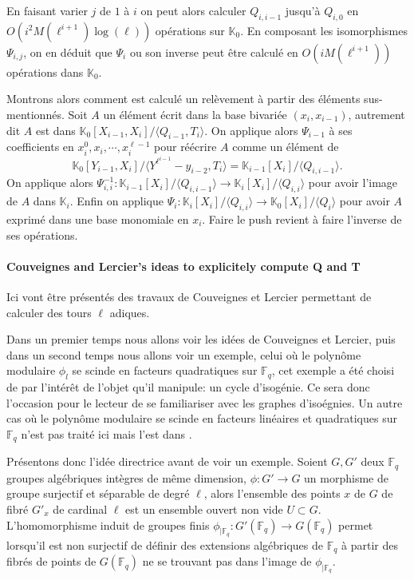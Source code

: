 \documentclass[10pt,a4paper]{book}
\theoremstyle{plain}
\theoremstyle{definition}
\theoremstyle{definition}
\theoremstyle{definition}
\theoremstyle{definition}
\theoremstyle{remark}
\theoremstyle{remark}
\begin{document}
En faisant varier $j$ de $1$ à $i$ on peut alors calculer $Q_{i,i-1}$ jusqu'à $Q_{i,0}$ en $O(i^2M(\ell^{i+1})\log(\ell))$ opérations sur $\mathbb{K}_0$. En composant les isomorphismes $\Psi_{i,j}$, on en déduit que $\Psi_i$ ou son inverse peut être calculé en $O(iM(\ell^{i+1}))$ opérations dans $\mathbb{K}_0$.

Montrons alors comment est calculé un relèvement à partir des éléments sus-mentionnés. Soit $A$ un élément écrit dans la base bivariée $(x_i,x_{i-1})$, autrement dit $A$ est dans $\mathbb{K}_0[X_{i-1},X_i]/\langle Q_{i-1}, T_{i} \rangle$. On applique alors $\Psi_{i-1}$ à ses coefficients en $x_i^0,x_i,\cdots, x_i^{\ell-1}$ pour réécrire $A$ comme un élément de
\begin{equation*}
\mathbb{K}_0[Y_{i-1},X_i]/\langle Y^{\ell^{i-1}}-y_{i-2},T_i \rangle = \mathbb{K}_{i-1}[X_i]/\langle Q_{i,i-1} \rangle.
\end{equation*}
On applique alors $\Psi_{i,i}^{-1}:\mathbb{K}_{i-1}[X_i]/\langle Q_{i,i-1} \rangle \to \mathbb{K}_i[X_i]/\langle Q_{i,i} \rangle$ pour avoir l'image de $A$ dans $\mathbb{K}_i$. Enfin on applique $\Psi_{i}:\mathbb{K}_i[X_i]/\langle Q_{i,i} \rangle \to \mathbb{K}_0[X_i]/ \langle Q_i \rangle $ pour avoir $A$ exprimé dans une base monomiale en $x_i$. Faire le push revient à faire l'inverse de ses opérations.

\paragraph{Couveignes and Lercier's ideas to explicitely compute Q and T}
Ici vont être présentés des travaux de Couveignes et Lercier \cite{couveignesLercier2013} permettant de calculer des tours $\ell$ adiques.

Dans un premier temps nous allons voir les idées de Couveignes et Lercier, puis dans un second temps nous allons voir un exemple, celui où le polynôme modulaire $\phi_l$ se scinde en facteurs quadratiques sur $\mathbb{F}_q$, cet exemple a été choisi de par l'intérêt de l'objet qu'il manipule: un cycle d'isogénie. Ce sera donc l'occasion pour le lecteur de se familiariser avec les graphes d'isoégnies. Un autre cas où le polynôme modulaire se scinde en facteurs linéaires et quadratiques sur $\mathbb{F}_q$ n'est pas traité ici mais l'est dans \cite{DeFeo-Doliskani-Schost13}.

Présentons donc l'idée directrice avant de voir un exemple. Soient $G,G'$ deux $\mathbb{F}_q$ groupes algébriques intègres de même dimension, $\phi: G' \to G$ un morphisme de groupe surjectif et séparable de degré $\ell$, alors l'ensemble des points $x$ de $G$ de fibré $G'_x$ de cardinal $\ell$ est un ensemble ouvert non vide $U \subset G$. 
L'homomorphisme induit de groupes finis $\phi_{\mid \mathbb{F}_q}: G'(\mathbb{F}_q) \to G(\mathbb{F}_q)$ permet lorsqu'il est non surjectif de définir des extensions algébriques de $\mathbb{F}_q$ à partir des fibrés de points de $G(\mathbb{F}_q)$ ne se trouvant pas dans l'image de $\phi_{\mid \mathbb{F}_q}$. 
\end{document}
